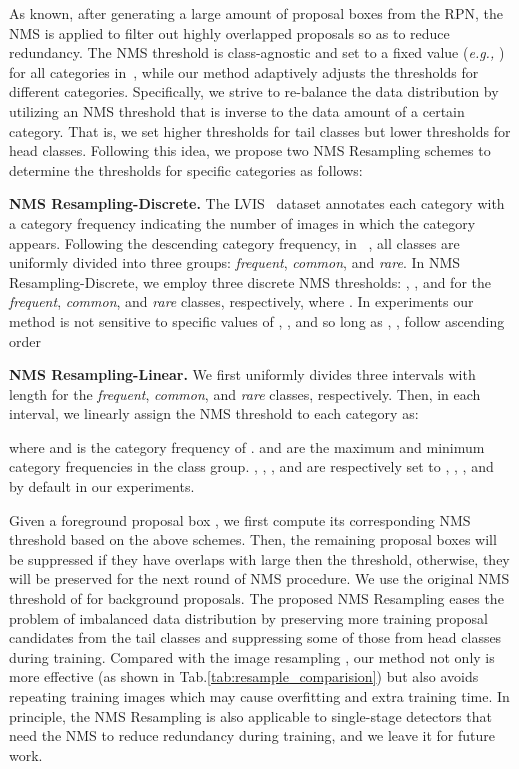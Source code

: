 \documentclass[sigconf]{acmart}
\newcommand{\myparagraph}[1]{{\vspace{0.5em} \noindent \bf #1}}
\begin{document}
As known, after generating a large amount of proposal boxes from the RPN, the NMS is applied to filter out highly overlapped proposals so as to reduce redundancy. The NMS threshold is class-agnostic and set to a fixed value (\emph{e.g.,} ) for all categories in~\cite{faster_rcnn,maskrcnn}, while our method adaptively adjusts the thresholds for different categories. Specifically, we strive to re-balance the data distribution by utilizing an NMS threshold that is inverse to the data amount of a certain category. That is, we set higher thresholds for tail classes but lower thresholds for head classes. Following this idea, we propose two NMS Resampling schemes to determine the thresholds for specific categories as follows:

\myparagraph{NMS Resampling-Discrete.} The LVIS~\cite{lvis} dataset annotates each category with a category frequency indicating the number of images in which the category appears. Following the descending category frequency, in ~\cite{lvis}, all  classes are uniformly divided into three groups: \emph{frequent}, \emph{common}, and \emph{rare}. In NMS Resampling-Discrete, we employ three discrete NMS thresholds: , , and  for the \emph{frequent}, \emph{common}, and \emph{rare} classes, respectively, where . In experiments our method is not sensitive to specific values of , , and   so long as , ,  follow ascending order

\myparagraph{NMS Resampling-Linear.} We first uniformly divides three intervals with length  for the \emph{frequent}, \emph{common}, and \emph{rare} classes, respectively. Then, in each interval, we linearly assign the NMS threshold to each category as:

where  and  is the category frequency of .  and  are the maximum and minimum category frequencies in the  class group. , , , and  are respectively set to , , , and  by default in our experiments.

Given a foreground proposal box , we first compute its corresponding NMS threshold based on the above schemes. Then, the remaining proposal boxes will be suppressed if they have overlaps with  large then the threshold, otherwise, they will be preserved for the next round of NMS procedure. We use the original NMS threshold of  for background proposals. The proposed NMS Resampling eases the problem of imbalanced data distribution by preserving more training proposal candidates from the tail classes and suppressing some of those from head classes during training. Compared with the image resampling \cite{lvis}, our method not only is more effective (as shown in Tab.\ref{tab:resample_comparision}) but also avoids repeating training images which may cause overfitting and extra training time. In principle, the NMS Resampling is also applicable to single-stage detectors that need the NMS to reduce redundancy during training, and we leave it for future work.
\end{document}
